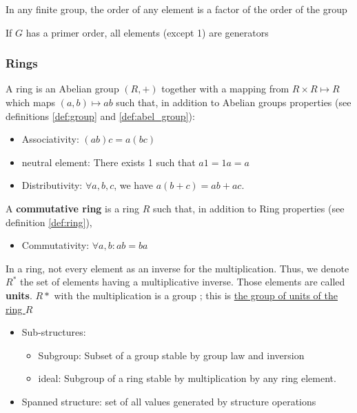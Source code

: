 \documentclass[11pt,a4paper]{article}
\begin{document}
\begin{theorem}[Lagrange]
    In any finite group, the order of any element is a factor of the order of the group
\end{theorem}
\begin{theorem}
    If $G$ has a primer order, all elements (except 1) are generators
\end{theorem}

\subsubsection{Rings}
\begin{definition}[Rings]
    \label{def:ring}
    A ring is an Abelian group $(R,+)$ together with a mapping from $R\times R \mapsto R$ which maps $(a,b) \mapsto ab$ such that, in addition to Abelian groups properties (see definitions \ref{def:group} and \ref{def:abel_group}):
    \begin{itemize}
        \item Associativity: $(ab)c = a(bc)$
        \item neutral element: There exists 1 such that $a1 = 1a = a$
        \item Distributivity: $\forall a,b,c$, we have $a(b+c) = ab + ac$.
    \end{itemize}
\end{definition}

\begin{definition}
    A \textbf{commutative ring} is a ring $R$ such that, in addition to Ring properties (see definition \ref{def:ring}),
    \begin{itemize}
        \item Commutativity: $\forall a,b: ab = ba$
    \end{itemize}
\end{definition}

\begin{definition}[Units]
    In a ring, not every element as an inverse for the multiplication. Thus, we denote $R^*$ the set of elements having a multiplicative inverse. Those elements are called \textbf{units}. $R*$ with the multiplication is a group ; this is \uline{the group of units of the ring $R$}
\end{definition}

\begin{definition}[Structures]
    \begin{itemize}
        \item Sub-structures:
            \begin{itemize}
                \item Subgroup: Subset of a group stable by group law and inversion
                \item ideal: Subgroup of a ring stable by multiplication by any ring element.
            \end{itemize}
        \item Spanned structure: set of all values generated by structure operations
    \end{itemize}
\end{definition}
\end{document}
